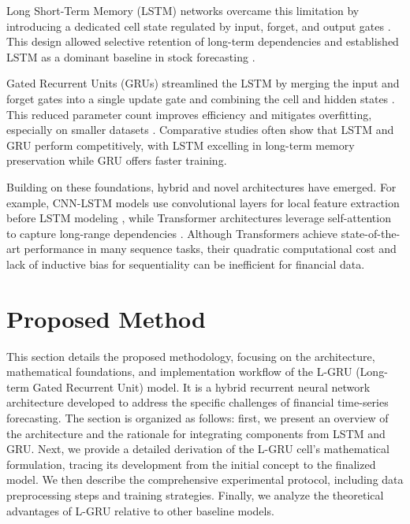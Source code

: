 \documentclass{cys}
\begin{document}
Long Short-Term Memory (LSTM) networks overcame this limitation by introducing a dedicated cell state regulated by input, forget, and output gates \cite{hochreiter1997long}. This design allowed selective retention of long-term dependencies and established LSTM as a dominant baseline in stock forecasting \cite{fischer2018deep, moghar2020stock}.

Gated Recurrent Units (GRUs) streamlined the LSTM by merging the input and forget gates into a single update gate and combining the cell and hidden states \cite{cho2014learning}. This reduced parameter count improves efficiency and mitigates overfitting, especially on smaller datasets \cite{chung2014empirical}. Comparative studies \cite{xiao2024comparative, nguyen2022accurate, bhavani2022comparative} often show that LSTM and GRU perform competitively, with LSTM excelling in long-term memory preservation while GRU offers faster training.

Building on these foundations, hybrid and novel architectures have emerged. For example, CNN-LSTM models use convolutional layers for local feature extraction before LSTM modeling \cite{hoseinzade2019cnn}, while Transformer architectures leverage self-attention to capture long-range dependencies \cite{vaswani2017attention}. Although Transformers achieve state-of-the-art performance in many sequence tasks, their quadratic computational cost and lack of inductive bias for sequentiality can be inefficient for financial data.

\section{Proposed Method}\label{sec:problem_formulation}
This section details the proposed methodology, focusing on the architecture, mathematical foundations, and implementation workflow of the L-GRU (Long-term Gated Recurrent Unit) model. It is a hybrid recurrent neural network architecture developed to address the specific challenges of financial time-series forecasting. The section is organized as follows: first, we present an overview of the architecture and the rationale for integrating components from LSTM and GRU. Next, we provide a detailed derivation of the L-GRU cell’s mathematical formulation, tracing its development from the initial concept to the finalized model. We then describe the comprehensive experimental protocol, including data preprocessing steps and training strategies. Finally, we analyze the theoretical advantages of L-GRU relative to other baseline models.
\end{document}
